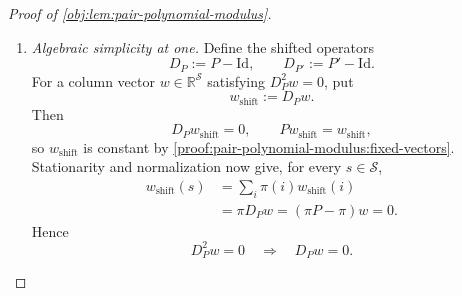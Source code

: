 \documentclass[11pt]{article}
\begin{document}
\begin{proof}[Proof of \cref{obj:lem:pair-polynomial-modulus}]
\begin{enumerate}
For polynomial matrix evaluation, use the convention
\[
F(z)=\sum_{k=0}^{n_F}F_kz^k\in\mathbb R[z],
\qquad n_F\in\mathbb N,\qquad
F(P):=\sum_{k=0}^{n_F}F_kP^k.
\]
Stationarity and induction give
\[
\pi P^k=\pi\quad(k\in\mathbb N),
\qquad
\pi F(P)=\sum_{k=0}^{n_F}F_k\pi P^k=F(1)\pi.
\]
Cayley--Hamilton, together with the characteristic factorization, yields
\[
(P-\mathrm{Id})q_P(P)=\chi_P(P)=0.
\]
Each column of \(q_P(P)\) therefore belongs to the fixed space established above.
Since each column is constant and \(\sum_s\pi(s)=1\), for every \(i,j\in\mathcal S\),
\[
[q_P(P)]_{ij}
=\sum_s\pi(s)[q_P(P)]_{sj}
=[\pi q_P(P)]_j
=q_P(1)\pi(j).
\]
With the rank-one matrix defined by
\[
(\mathbf1\pi)_{ij}:=\pi(j)\quad(i,j\in\mathcal S),
\]
this says
\[
q_P(P)=q_P(1)\mathbf1\pi.
\]
Multiplying by \(q_{P'}(P)\) and using polynomial stationarity gives
\[
\begin{aligned}
Q_{P,P'}(P)
&=q_P(P)q_{P'}(P)\\
&=q_P(1)\mathbf1\bigl(\pi q_{P'}(P)\bigr)\\
&=q_P(1)q_{P'}(1)\mathbf1\pi
=Q_{P,P'}(1)\mathbf1\pi.
\end{aligned}
\]
Applying the same calculation to \(P'\), with the polynomial factors in the opposite order, gives
\[
Q_{P,P'}(P')=Q_{P,P'}(1)\mathbf1\pi'.
\]

Since the initial vectors have total mass one, these projection identities imply
\[
\nu Q_{P,P'}(P)r=Q_{P,P'}(1)\pi r,
\qquad
\nu'Q_{P,P'}(P')r'=Q_{P,P'}(1)\pi'r'.
\]
On the other hand, expanding the polynomial of degree at most six gives
\[
\nu Q_{P,P'}(P)r=\sum_{k=0}^6Q_k\nu P^kr,
\qquad
\nu'Q_{P,P'}(P')r'=\sum_{k=0}^6Q_k\nu'P'^kr'.
\]
Subtracting proves
\[
Q_{P,P'}(1)(\pi r-\pi'r')
=\sum_{k=0}^6Q_k\bigl(\nu P^kr-\nu'P'^kr'\bigr).
\]

\item \emph{Algebraic simplicity at one.}
Define the shifted operators
\[
D_P:=P-\mathrm{Id},\qquad D_{P'}:=P'-\mathrm{Id}.
\]
For a column vector \(w\in\mathbb R^{\mathcal S}\) satisfying \(D_P^2w=0\), put
\[
w_{\mathrm{shift}}:=D_Pw.
\]
Then
\[
D_Pw_{\mathrm{shift}}=0,\qquad
Pw_{\mathrm{shift}}=w_{\mathrm{shift}},
\]
so \(w_{\mathrm{shift}}\) is constant by \cref{proof:pair-polynomial-modulus:fixed-vectors}.
Stationarity and normalization now give, for every \(s\in\mathcal S\),
\[
\begin{aligned}
w_{\mathrm{shift}}(s)
&=\sum_i\pi(i)w_{\mathrm{shift}}(i)\\
&=\pi D_Pw
=(\pi P-\pi)w=0.
\end{aligned}
\]
Hence
\[
D_P^2w=0\quad\Longrightarrow\quad D_Pw=0.
\]


\end{enumerate}
\end{proof}
\end{document}
